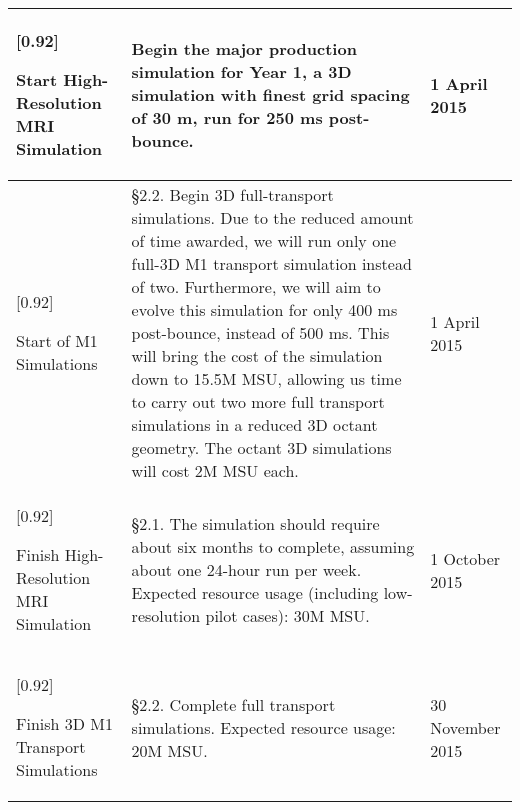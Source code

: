 \documentclass[11pt]{article}
\begin{document}
\begin{table}[t]
\begin{tabular}{|p{2.00in}|p{5.6in}|p{1.20in}|}
\rowcolor{Aquamarine1}[0.92\tabcolsep]
\raggedright
Start High-Resolution MRI Simulation&
%
Begin the major production simulation for Year 1, a 3D simulation with finest grid spacing of 30 m, run for 250 ms post-bounce.
&
%
\raggedright
1 April 2015  \tabularnewline
\hline
\rowcolor{Aquamarine1}[0.92\tabcolsep]
\raggedright
Start of M1 Simulations &
%
\S2.2. Begin 3D full-transport simulations.  Due to the reduced amount of time awarded, we will run only one full-3D M1 transport simulation instead of two.
Furthermore, we will aim to evolve this simulation for only 400 ms post-bounce, instead of 500 ms.  
This will bring the cost of the simulation down to 15.5M MSU, allowing us time to carry out two more full transport simulations in a reduced 3D octant geometry. 
The octant 3D simulations will cost 2M MSU each.
&
%
\raggedright
1 April 2015 \tabularnewline
\hline
\rowcolor{Aquamarine1}[0.92\tabcolsep]
\raggedright
Finish High-Resolution MRI Simulation &
%
\S2.1. The simulation should require about six months to complete, assuming about one 24-hour run per week.
Expected resource usage (including low-resolution pilot cases): 30M MSU.
&
%
\raggedright
1 October 2015 \tabularnewline
\hline
\rowcolor{Aquamarine1}[0.92\tabcolsep]
\raggedright
Finish 3D M1 Transport Simulations &
%
\S2.2. Complete full transport simulations.
Expected resource usage: 20M MSU.
&
%
\raggedright
30 November 2015 \tabularnewline
\hline
%
\hline
\end{tabular}
\raisebox{-0.5cm}{\quad$^1$Yellow: code development; 
Teal: simulations on Mira.}\\
\\
\end{table}
\newpage
\end{document}
